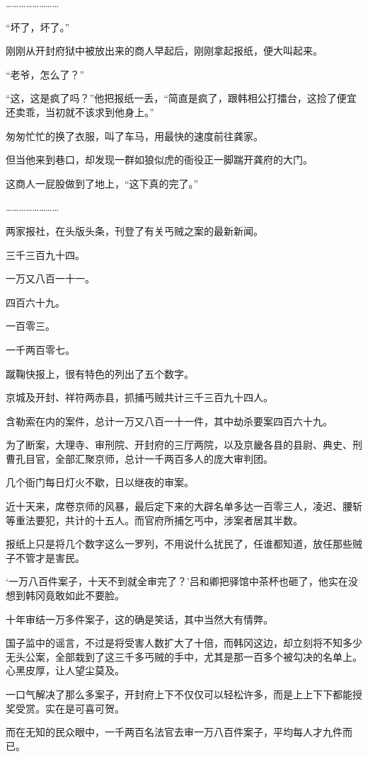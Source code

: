 ……………………

“坏了，坏了。”

刚刚从开封府狱中被放出来的商人早起后，刚刚拿起报纸，便大叫起来。

“老爷，怎么了？”

“这，这是疯了吗？”他把报纸一丢，“简直是疯了，跟韩相公打擂台，这捡了便宜还卖乖，当初就不该求到他身上。”

匆匆忙忙的换了衣服，叫了车马，用最快的速度前往龚家。

但当他来到巷口，却发现一群如狼似虎的衙役正一脚踹开龚府的大门。

这商人一屁股做到了地上，“这下真的完了。”

……………………

两家报社，在头版头条，刊登了有关丐贼之案的最新新闻。

三千三百九十四。

一万又八百一十一。

四百六十九。

一百零三。

一千两百零七。

蹴鞠快报上，很有特色的列出了五个数字。

京城及开封、祥符两赤县，抓捕丐贼共计三千三百九十四人。

含勒索在内的案件，总计一万又八百一十一件，其中劫杀要案四百六十九。

为了断案，大理寺、审刑院、开封府的三厅两院，以及京畿各县的县尉、典史、刑曹孔目官，全部汇聚京师，总计一千两百多人的庞大审判团。

几个衙门每日灯火不歇，日以继夜的审案。

近十天来，席卷京师的风暴，最后定下来的大辟名单多达一百零三人，凌迟、腰斩等重法要犯，共计的十五人。而官府所捕乞丐中，涉案者居其半数。

报纸上只是将几个数字这么一罗列，不用说什么扰民了，任谁都知道，放任那些贼子不管才是害民。

‘一万八百件案子，十天不到就全审完了？’吕和卿把驿馆中茶杯也砸了，他实在没想到韩冈竟敢如此不要脸。

十年审结一万多件案子，这的确是笑话，其中当然大有情弊。

国子监中的谣言，不过是将受害人数扩大了十倍，而韩冈这边，却立刻将不知多少无头公案，全部栽到了这三千多丐贼的手中，尤其是那一百多个被勾决的名单上。心黑皮厚，让人望尘莫及。

一口气解决了那么多案子，开封府上下不仅仅可以轻松许多，而是上上下下都能授奖受赏。实在是可喜可贺。

而在无知的民众眼中，一千两百名法官去审一万八百件案子，平均每人才九件而已。

